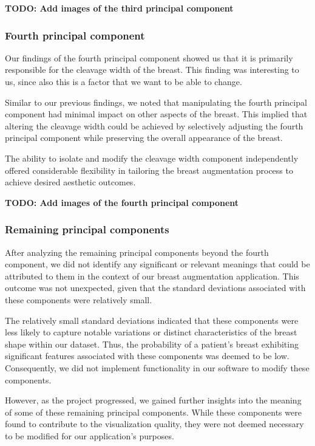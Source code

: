 \textbf{TODO: Add images of the third principal component}

\subsubsection{Fourth principal component}

Our findings of the fourth principal component showed us that it is primarily responsible for the cleavage width of the breast. This finding was interesting to us, since also this is a factor that we want
to be able to change.

Similar to our previous findings, we noted that manipulating the fourth principal component had minimal impact on other aspects of the breast. This implied that altering the cleavage width could 
be achieved by selectively adjusting the fourth principal component while preserving the overall appearance of the breast.

The ability to isolate and modify the cleavage width component independently offered considerable flexibility in tailoring the breast augmentation process to achieve desired aesthetic outcomes. 

\textbf{TODO: Add images of the fourth principal component}

\subsubsection{Remaining principal components}

After analyzing the remaining principal components beyond the fourth component, we did not identify any significant or relevant meanings that could be attributed to them in the context of our breast 
augmentation application. This outcome was not unexpected, given that the standard deviations associated with these components were relatively small.

The relatively small standard deviations indicated that these components were less likely to capture notable variations or distinct characteristics of the breast shape within our dataset. 
Thus, the probability of a patient's breast exhibiting significant features associated with these components was deemed to be low. Consequently, we did not implement functionality in our 
software to modify these components.

However, as the project progressed, we gained further insights into the meaning of some of these remaining principal components. While these components were found to contribute to the 
visualization quality, they were not deemed necessary to be modified for our application's purposes.


